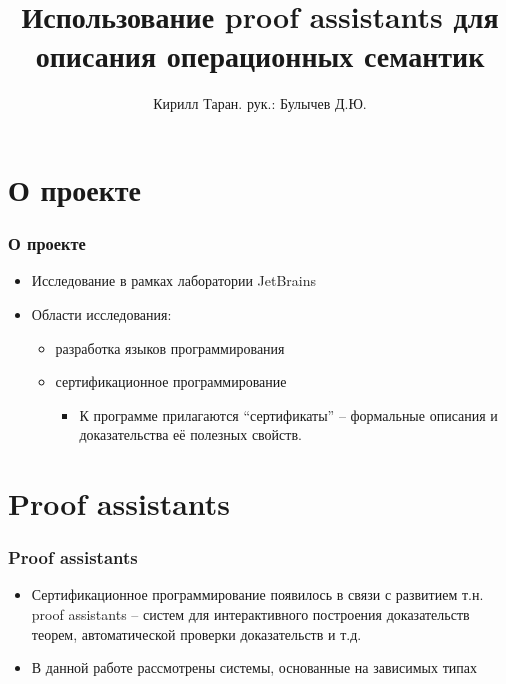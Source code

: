 \documentclass[12pt,pdf,hyperref={unicode}]{beamer}
\begin{document}
      \title[Proof assistants и семантики]{Использование proof assistants для описания операционных семантик}
      \author[Кирилл Таран]{Кирилл Таран. рук.: Булычев Д.Ю.}

      \frame{\titlepage}

      \section{О проекте}
      \begin{frame}
         \frametitle{О проекте}
         \begin{itemize}
            \item Исследование в рамках лаборатории JetBrains
            \item Области исследования:
               \begin{itemize}
                  \item разработка языков программирования
                  \item сертификационное программирование
                     \begin{itemize}
                     \item К программе прилагаются ``сертификаты'' -- формальные описания
                      и доказательства её полезных свойств.
                     \end{itemize}
               \end{itemize}
         \end{itemize}
      \end{frame}


      \section{Proof assistants}
      \begin{frame}
         \frametitle{Proof assistants}
         \begin{itemize}
            \item Сертификационное программирование появилось
            в связи с развитием т.н. proof assistants -- систем
            для интерактивного построения доказательств теорем,
            автоматической проверки доказательств и т.д.
            \item В данной работе рассмотрены системы,
            основанные на зависимых типах
         \end{itemize}
      \end{frame}
\end{document}
